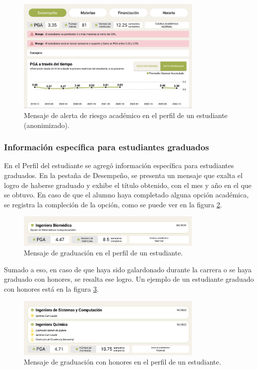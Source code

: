 \begin{figure}[H]
  \centering
  \includegraphics[width=0.8\textwidth]{img/nes/riesgo_academico.png}
  \caption{Mensaje de alerta de riesgo académico en el perfil de un estudiante (anonimizado).}
  \label{fig:riesgo_academico}
\end{figure}

\subsubsection{Información específica para estudiantes graduados}

En el Perfil del estudiante se agregó información específica para estudiantes graduados. En la pestaña de Desempeño, se presenta un mensaje que exalta el logro de haberse graduado y exhibe el título obtenido, con el mes y año en el que se obtuvo. En caso de que el alumno haya completado alguna opción académica, se registra la compleción de la opción, como se puede ver en la figura \ref{fig:graduado}.

\begin{figure}[H]
  \centering
  \includegraphics[width=0.8\textwidth]{img/nes/graduado.png}
  \caption{Mensaje de graduación en el perfil de un estudiante.}
  \label{fig:graduado}
\end{figure}

Sumado a eso, en caso de que haya sido galardonado durante la carrera o se haya graduado con honores, se resalta ese logro. Un ejemplo de un estudiante graduado con honores está en la figura \ref{fig:graduado_honores}.

\begin{figure}[H]
  \centering
  \includegraphics[width=0.8\textwidth]{img/nes/graduado_honores.png}
  \caption{Mensaje de graduación con honores en el perfil de un estudiante.}
  \label{fig:graduado_honores}
\end{figure}
